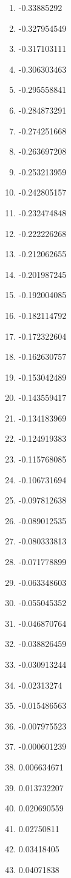 \documentclass[6pt]{article}
\begin{document}
\begin{multicols}{4}
\begin{enumerate}
		\item -0.33885292
		\item -0.327954549
		\item -0.317103111
		\item -0.306303463
		\item -0.295558841
		\item -0.284873291
		\item -0.274251668
		\item -0.263697208
		\item -0.253213959
		\item -0.242805157
		\item -0.232474848
		\item -0.222226268
		\item -0.212062655
		\item -0.201987245
		\item -0.192004085
		\item -0.182114792
		\item -0.172322604
		\item -0.162630757
		\item -0.153042489
		\item -0.143559417
		\item -0.134183969
		\item -0.124919383
		\item -0.115768085
		\item -0.106731694
		\item -0.097812638
		\item -0.089012535
		\item -0.080333813
		\item -0.071778899
		\item -0.063348603
		\item -0.055045352
		\item -0.046870764
		\item -0.038826459
		\item -0.030913244
		\item -0.02313274
		\item -0.015486563
		\item -0.007975523
		\item -0.000601239
		\item 0.006634671
		\item 0.013732207
		\item 0.020690559
		\item 0.02750811
		\item 0.03418405
		\item 0.04071838

\end{enumerate}
\end{multicols}
\end{document}
